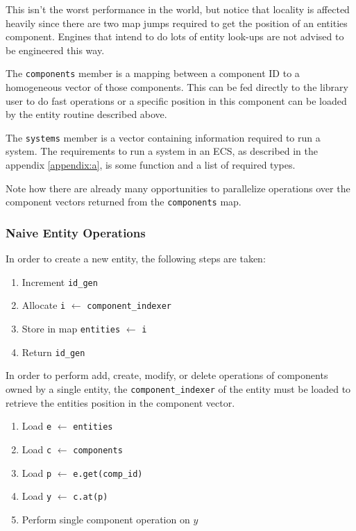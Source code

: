 This isn't the worst performance in the world, but notice that locality is affected heavily since there are two map jumps required to get the position of an entities component. Engines that intend to do lots of entity look-ups are not advised to be engineered this way. 

The \texttt{components} member is a mapping between a component ID to a homogeneous vector of those components. This can be fed directly to the library user to do fast operations or a specific position in this component can be loaded by the entity routine described above.

The \texttt{systems} member is a vector containing information required to run a system. The requirements to run a system in an ECS, as described in the appendix \ref{appendix:a}, is some function and a list of required types. 

Note how there are already many opportunities to parallelize operations over the component vectors returned from the \texttt{components} map.

\subsubsection{Naive Entity Operations}
In order to create a new entity, the following steps are taken:
\begin{enumerate}
    \item Increment \texttt{id\_gen}
    \item Allocate \texttt{i} $\leftarrow$ \texttt{component\_indexer} 
    \item Store in map \texttt{entities} $\leftarrow$ \texttt{i}
    \item Return \texttt{id\_gen}
\end{enumerate}

In order to perform add, create, modify, or delete operations of components owned by a single entity, the \texttt{component\_indexer} of the entity must be loaded to retrieve the entities position in the component vector.

\begin{enumerate}
    \item Load \texttt{e} $\leftarrow$ \texttt{entities}
    \item Load \texttt{c} $\leftarrow$ \texttt{components}
    \item Load \texttt{p} $\leftarrow$ \texttt{e.get(comp\_id)}
    \item Load \texttt{y} $\leftarrow$ \texttt{c.at(p)}
    \item Perform single component operation on $y$
\end{enumerate}

